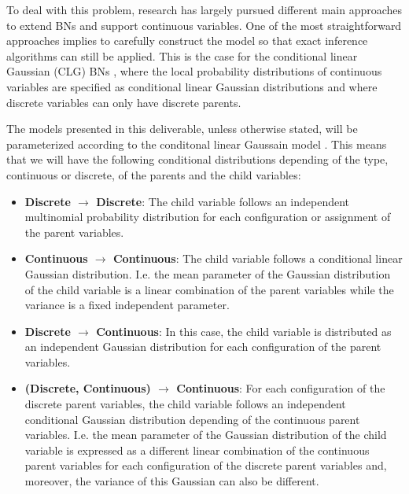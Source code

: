 To deal with this problem, research has largely pursued different main approaches to extend BNs and support continuous variables. One of the most straightforward approaches implies to carefully construct the model so that exact inference algorithms can still be applied. This is the case for the conditional linear Gaussian (CLG) BNs \cite{Lauritzen1992,LauritzenJensen2001}, where the local probability distributions of continuous variables are specified as conditional linear Gaussian distributions and where discrete variables can only have discrete parents. 

The models presented in this deliverable, unless otherwise stated, will be parameterized according to the conditonal linear Gaussain model \cite{Lauritzen1992,LauritzenJensen2001}. This means that we will have the following conditional distributions depending of the type, continuous or discrete, of the parents and the child variables:


\begin{itemize}
\item \textbf{Discrete $\rightarrow$ Discrete}: The child variable follows an independent multinomial probability distribution for each configuration or assignment of the parent variables.

\item \textbf{Continuous $\rightarrow$ Continuous}: The child variable follows a conditional linear Gaussian distribution. I.e. the mean parameter of the Gaussian distribution of the child variable is a linear combination of the parent variables while the variance is a fixed independent parameter. 

\item \textbf{Discrete $\rightarrow$ Continuous}: In this case, the child variable is distributed as an independent Gaussian distribution for each configuration of the parent variables. 

\item \textbf{ (Discrete, Continuous) $\rightarrow$ Continuous}:  For each configuration of the discrete parent variables, the child variable follows an independent conditional Gaussian distribution depending of the continuous parent variables. I.e. the mean parameter of the Gaussian distribution of the child variable is expressed as a different linear combination of the continuous parent variables for each configuration of the discrete parent variables and, moreover, the variance of this Gaussian can also be different. 

\end{itemize}
 

